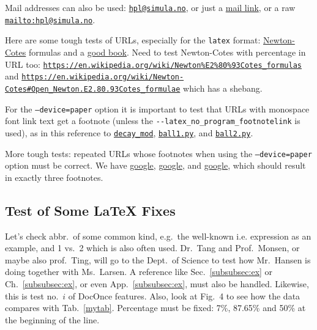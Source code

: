 \documentclass[%
oneside,                 %
final,                   %
10pt]{article}
\theoremstyle{definition}
\begin{document}
\begin{enumerate}
Mail addresses can also be used: \href{{mailto:hpl@simula.no}}{\nolinkurl{hpl@simula.no}}, or just a \href{{mailto:hpl@simula.no}}{mail link}, or a raw \href{{mailto:hpl@simula.no}}{\nolinkurl{mailto:hpl@simula.no}}.

Here are some tough tests of URLs, especially for the \texttt{latex} format:
\href{{https://en.wikipedia.org/wiki/Newton%
and a \href{{https://www.springer.com/mathematics/computational+science+%
Newton-Cotes with percentage in URL too:
\href{{https://en.wikipedia.org/wiki/Newton%
and \href{{https://en.wikipedia.org/wiki/Newton-Cotes#Open_Newton.E2.80.93Cotes_formulae}}{\nolinkurl{https://en.wikipedia.org/wiki/Newton-Cotes\#Open_Newton.E2.80.93Cotes_formulae}} which has a shebang.

For the \texttt{--device=paper} option it is important to test that URLs with
monospace font link text get a footnote
(unless the \Verb!--latex_no_program_footnotelink!
is used), as in this reference to
\href{{https://github.com/hplgit/INF5620/tree/gh-pages/src/decay/experiments/decay_mod.py}}{\nolinkurl{decay_mod}}, \href{{https://tinyurl.com/pwyasaa/formulas.ball1.py}}{\nolinkurl{ball1.py}},
and \href{{https://tinyurl.com/pwyasaa/formulas.ball2.py}}{\nolinkurl{ball2.py}}.



More tough tests: repeated URLs whose footnotes when using the
\texttt{--device=paper} option must be correct. We have
\href{{https://google.com}}{google}, \href{{https://google.com}}{google}, and
\href{{https://google.com}}{google}, which should result in exactly three
footnotes.

\subsection{Test of Some {\LaTeX} Fixes}

Let's check abbr.~of some common kind, e.g.~the well-known i.e.
expression as an example, and 1 vs.~2 which is also often used.
Dr.~Tang and Prof.~Monsen, or maybe also prof.~Ting,
will go to the Dept.~of Science to test how Mr.~Hansen is doing together
with Ms.~Larsen. A reference like Sec.~\vref{subsubsec:ex} or
Ch.~\vref{subsubsec:ex}, or even App.~\vref{subsubsec:ex}, must also be
handled. Likewise, this is test no.~$i$ of DocOnce features.
Also, look at Fig.~4 to see how the data compares with Tab.~\vref{mytab}.
Percentage must be fixed: 7\%,  87.65\% and
50\% at the beginning of the line.


\end{enumerate}
\end{document}
